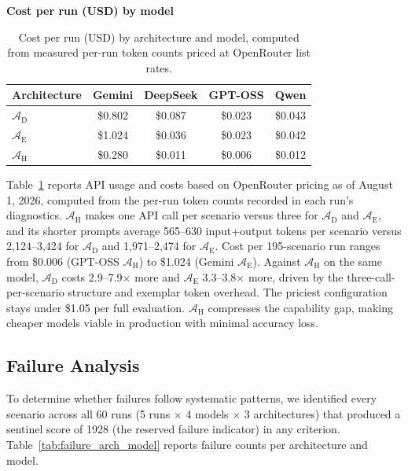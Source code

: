 \documentclass[final,3p,times]{elsarticle}
\begin{document}
\begin{table}[htpb]
\begin{threeparttable}
\small
\centering
\textbf{Cost per run (USD) by model}
\renewcommand{\arraystretch}{1.15}
\begin{tabular}{lcccc}
\toprule
Architecture & Gemini & DeepSeek & GPT-OSS & Qwen \\
\midrule
$\mathcal{A}_{\text{D}}$ & \$0.802 & \$0.087 & \$0.023 & \$0.043 \\
$\mathcal{A}_{\text{E}}$ & \$1.024 & \$0.036 & \$0.023 & \$0.042 \\
$\mathcal{A}_{\text{H}}$ & \$0.280 & \$0.011 & \$0.006 & \$0.012 \\
\bottomrule
\end{tabular}
\renewcommand{\arraystretch}{1.0}
\caption{Cost per run (USD) by architecture and model, computed from measured per-run token counts priced at OpenRouter list rates.}
\label{tab:item8}
\end{threeparttable}
\end{table}

Table~\ref{tab:item8} reports API usage and costs based on OpenRouter pricing as of August 1, 2026, computed from the per-run token counts recorded in each run's diagnostics. $\mathcal{A}_{\text{H}}$ makes one API call per scenario versus three for $\mathcal{A}_{\text{D}}$ and $\mathcal{A}_{\text{E}}$, and its shorter prompts average 565--630 input+output tokens per scenario versus 2,124--3,424 for $\mathcal{A}_{\text{D}}$ and 1,971--2,474 for $\mathcal{A}_{\text{E}}$. Cost per 195-scenario run ranges from \$0.006 (GPT-OSS $\mathcal{A}_{\text{H}}$) to \$1.024 (Gemini $\mathcal{A}_{\text{E}}$). Against $\mathcal{A}_{\text{H}}$ on the same model, $\mathcal{A}_{\text{D}}$ costs 2.9--7.9$\times$ more and $\mathcal{A}_{\text{E}}$ 3.3--3.8$\times$ more, driven by the three-call-per-scenario structure and exemplar token overhead. The priciest configuration stays under \$1.05 per full evaluation. $\mathcal{A}_{\text{H}}$ compresses the capability gap, making cheaper models viable in production with minimal accuracy loss.

\FloatBarrier
\subsection{Failure Analysis}
\label{sec:res-failures}

To determine whether failures follow systematic patterns, we identified every scenario across all 60 runs (5 runs $\times$ 4 models $\times$ 3 architectures) that produced a sentinel score of 1928 (the reserved failure indicator) in any criterion. Table~\ref{tab:failure_arch_model} reports failure counts per architecture and model.
\end{document}
